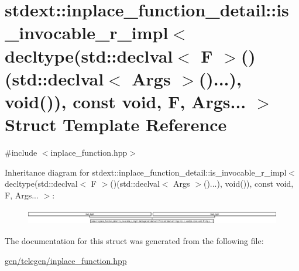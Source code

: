 \hypertarget{structstdext_1_1inplace__function__detail_1_1is__invocable__r__impl_3_01decltype_07std_1_1declva0b72e3b51b5a25ed55b63381e8d17b0a}{}\section{stdext\+:\+:inplace\+\_\+function\+\_\+detail\+:\+:is\+\_\+invocable\+\_\+r\+\_\+impl$<$ decltype(std\+:\+:declval$<$ F $>$()(std\+:\+:declval$<$ Args $>$()...), void()), const void, F, Args... $>$ Struct Template Reference}
\label{structstdext_1_1inplace__function__detail_1_1is__invocable__r__impl_3_01decltype_07std_1_1declva0b72e3b51b5a25ed55b63381e8d17b0a}


{\ttfamily \#include $<$inplace\+\_\+function.\+hpp$>$}

Inheritance diagram for stdext\+:\+:inplace\+\_\+function\+\_\+detail\+:\+:is\+\_\+invocable\+\_\+r\+\_\+impl$<$ decltype(std\+:\+:declval$<$ F $>$()(std\+:\+:declval$<$ Args $>$()...), void()), const void, F, Args... $>$\+:\begin{figure}[H]
\begin{center}
\leavevmode
\includegraphics[height=0.695652cm]{structstdext_1_1inplace__function__detail_1_1is__invocable__r__impl_3_01decltype_07std_1_1declva0b72e3b51b5a25ed55b63381e8d17b0a}
\end{center}
\end{figure}


The documentation for this struct was generated from the following file\+:\begin{DoxyCompactItemize}
\item 
\hyperlink{gen_2telegen_2inplace__function_8hpp}{gen/telegen/inplace\+\_\+function.\+hpp}\end{DoxyCompactItemize}
